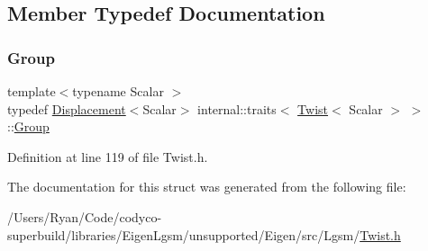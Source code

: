 \subsection{Member Typedef Documentation}
\hypertarget{structinternal_1_1traits_3_01_twist_3_01_scalar_01_4_01_4_a7dd4af76dbf2ef6b4e68ceb1249d14c9}{}\label{structinternal_1_1traits_3_01_twist_3_01_scalar_01_4_01_4_a7dd4af76dbf2ef6b4e68ceb1249d14c9} 
\subsubsection{\texorpdfstring{Group}{Group}}
{\footnotesize\ttfamily template$<$typename Scalar $>$ \\
typedef \hyperlink{class_displacement}{Displacement}$<$Scalar$>$ internal\+::traits$<$ \hyperlink{class_twist}{Twist}$<$ Scalar $>$ $>$\+::\hyperlink{structinternal_1_1traits_3_01_lie_algebra_3_01_matrix_3_01_scalar_00_016_00_011_01_4_01_4_01_4_a2a6e55a56a1c0c3b97c50cb8598ac55a}{Group}}



Definition at line 119 of file Twist.\+h.



The documentation for this struct was generated from the following file\+:\begin{DoxyCompactItemize}
\item 
/\+Users/\+Ryan/\+Code/codyco-\/superbuild/libraries/\+Eigen\+Lgsm/unsupported/\+Eigen/src/\+Lgsm/\hyperlink{_twist_8h}{Twist.\+h}\end{DoxyCompactItemize}
